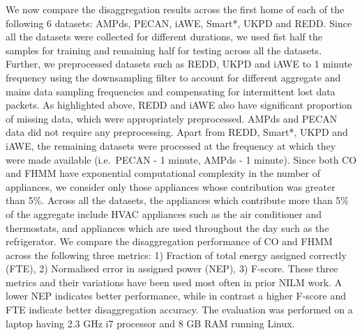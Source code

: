 \documentclass{sig-alternate}
\newcommand{\redcolor}[1]{\textcolor{red}{#1}}
\newcommand{\tabref}[1]{Table~\ref{#1}}
\begin{document}
\noindent
We now compare the disaggregation results across the first home of each of the following 6 datasets: AMPds, PECAN, iAWE, Smart*, UKPD and REDD. Since all the datasets were collected for different durations, we used fist half the samples for training and remaining half for testing across all the datasets. Further, we preprocessed datasets such as REDD, UKPD and iAWE to 1 minute frequency using the downsampling filter to account for different aggregate and mains data sampling frequencies and compensating for intermittent lost data packets. 
As highlighted above, REDD and iAWE also have significant proportion of missing data, which were appropriately preprocessed. AMPds and PECAN data did not require any preprocessing. Apart from REDD, Smart*, UKPD and iAWE, the remaining datasets were processed at the frequency at which they were made available (i.e.\ PECAN - 1 minute, AMPds - 1 minute). Since both CO and FHMM have exponential computational complexity in the number of appliances, we consider only those appliances whose contribution was greater than 5\%. Across all the datasets, the appliances which contribute more than 5\% of the aggregate include HVAC appliances such as the air conditioner and thermostats, and appliances which are used throughout the day such as the refrigerator. We compare the disaggregation performance of CO and FHMM across the following three metrics: 1) Fraction of total energy assigned correctly (FTE), 2) Normalised error in assigned power (NEP), 3) F-score. These three metrics and their variations have been used most often in prior NILM work. %
A lower NEP indicates better performance, while in contrast a higher F-score and FTE indicate better disaggregation accuracy. The evaluation was performed on a laptop having 2.3 GHz i7 processor and 8 GB RAM running Linux.

\end{document}
